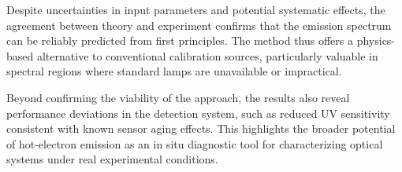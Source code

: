 \documentclass[
	parskip=half,
	a4paper,
]{scrarticle}
\begin{document}
Despite uncertainties in input parameters and potential systematic effects, the agreement between theory and experiment confirms that the emission spectrum can be reliably predicted from first principles. The method thus offers a physics-based alternative to conventional calibration sources, particularly valuable in spectral regions where standard lamps are unavailable or impractical.

Beyond confirming the viability of the approach, the results also reveal performance deviations in the detection system, such as reduced UV sensitivity consistent with known sensor aging effects. This highlights the broader potential of hot-electron emission as an in situ diagnostic tool for characterizing optical systems under real experimental conditions.


\clearpage
\printbibliography
\end{document}
